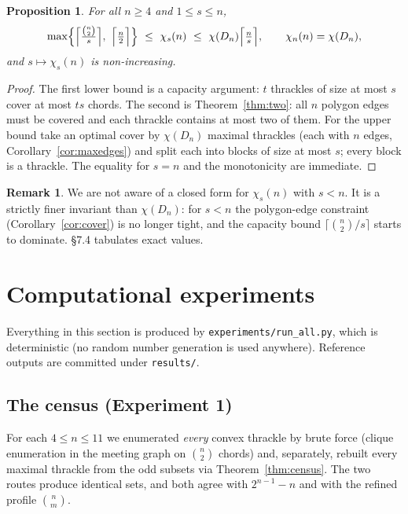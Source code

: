 \documentclass[11pt,a4paper]{article}
\newtheorem{proposition}[theorem]{Proposition}
\theoremstyle{definition}
\newtheorem{remark}[theorem]{Remark}
\theoremstyle{plain}
\begin{document}
\begin{proposition}\label{prop:chis}
For all $n\ge4$ and $1\le s\le n$,
\[
\max\Bigl\{\Bigl\lceil\tfrac{\binom n2}{s}\Bigr\rceil,\ \Bigl\lceil\tfrac n2\Bigr\rceil\Bigr\}
\ \le\ \chi_s(n)\ \le\ \chi(D_n)\Bigl\lceil\tfrac n s\Bigr\rceil ,
\qquad \chi_n(n)=\chi(D_n),
\]
and $s\mapsto\chi_s(n)$ is non-increasing.
\end{proposition}

\begin{proof}
The first lower bound is a capacity argument: $t$ thrackles of size at most $s$
cover at most $ts$ chords.  The second is Theorem~\ref{thm:two}: all $n$
polygon edges must be covered and each thrackle contains at most two of them.
For the upper bound take an optimal cover by $\chi(D_n)$ maximal thrackles
(each with $n$ edges, Corollary~\ref{cor:maxedges}) and split each into blocks
of size at most $s$; every block is a thrackle.  The equality for $s=n$ and the
monotonicity are immediate.
\end{proof}

\begin{remark}
We are not aware of a closed form for $\chi_s(n)$ with $s<n$.  It is a strictly
finer invariant than $\chi(D_n)$: for $s<n$ the polygon-edge constraint
(Corollary~\ref{cor:cover}) is no longer tight, and the capacity bound
$\lceil\binom n2 / s\rceil$ starts to dominate.  §7.4 tabulates exact values.
\end{remark}

\section{Computational experiments}

Everything in this section is produced by \texttt{experiments/run\_all.py}, which
is deterministic (no random number generation is used anywhere).  Reference
outputs are committed under \texttt{results/}.

\subsection{The census (Experiment 1)}

For each $4\le n\le11$ we enumerated \emph{every} convex thrackle by brute force
(clique enumeration in the meeting graph on $\binom n2$ chords) and, separately,
rebuilt every maximal thrackle from the odd subsets via
Theorem~\ref{thm:census}.  The two routes produce identical sets, and both agree
with $2^{n-1}-n$ and with the refined profile $\binom nm$.
\end{document}
